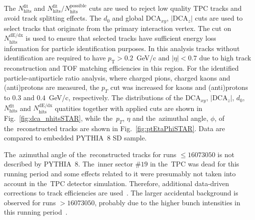 The $N_{\textrm{hits}}^{\textrm{fit}}$ and $N_{\textrm{hits}}^{\textrm{fit}}/N_{\textrm{hits}}^{\textrm{possible}}$ cuts are used to reject low quality TPC tracks and avoid track splitting effects. The $d_0$ and global $\textrm{DCA}_{xy}$,  $|\textrm{DCA}_{z}|$ cuts are used to select tracks that originate from the primary interaction vertex. The cut on $N_{\textrm{hits}}^{\textrm{dE/dx}}$ is used to ensure that selected tracks have sufficient energy loss information
for particle identification purposes. In this analysis tracks without identification are required to have $p_\textrm{T} > 0.2$~GeV/c and $|\eta| < 0.7$ due to high track reconstruction and TOF matching efficiencies in this region. For the identified particle-antiparticle ratio analysis, where charged pions, charged kaons and (anti)protons  are measured, the $p_T$ cut was increased for kaons and (anti)protons  to $0.3$ and $0.4$~GeV/c, respectively. 
The distributions of the $\textrm{DCA}_{xy}$, $|\textrm{DCA}_{z}|$, $d_0$, $N_{\textrm{hits}}^{\textrm{fit}}$ and $N_{\textrm{hits}}^{\textrm{dE/dx}}$ quatities together with applied cuts are shown in Fig.~\ref{fig:dca_nhitsSTAR}, while the~$p_T$, $\eta$ and  the~azimuthal angle, $\phi$, of the~reconstructed tracks are shown in Fig.~\ref{fig:ptEtaPhiSTAR}. Data are compared to embedded PYTHIA~8 SD sample.

 The~azimuthal angle of the~reconstructed tracks for runs $\leq 16073050$ is not described by PYTHIA~8. 
The~inner sector $\#19$ in the~TPC was dead for this running period and some effects related to it were presumably not taken into account in the~TPC detector simulation. Therefore, additional data-driven corrections to track efficiencies are used~\cite{supplementaryNote}.
The larger accidental background is  observed for  runs $>16073050$, probably due to the higher bunch intensities in this running period~\cite{starLumi}.
 

